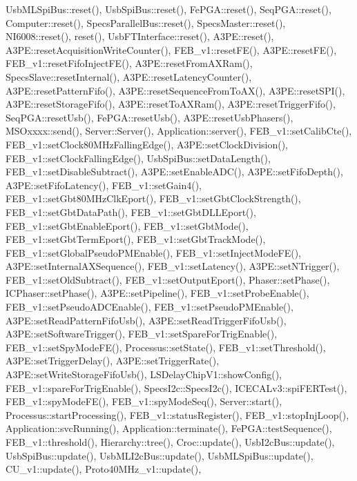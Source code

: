Usb\+M\+L\+Spi\+Bus\+::reset(), Usb\+Spi\+Bus\+::reset(), Fe\+P\+G\+A\+::reset(), Seq\+P\+G\+A\+::reset(), Computer\+::reset(), Specs\+Parallel\+Bus\+::reset(), Specs\+Master\+::reset(), N\+I6008\+::reset(), reset(), Usb\+F\+T\+Interface\+::reset(), A3\+P\+E\+::reset(), A3\+P\+E\+::reset\+Acquisition\+Write\+Counter(), F\+E\+B\+\_\+v1\+::reset\+F\+E(), A3\+P\+E\+::reset\+F\+E(), F\+E\+B\+\_\+v1\+::reset\+Fifo\+Inject\+F\+E(), A3\+P\+E\+::reset\+From\+A\+X\+Ram(), Specs\+Slave\+::reset\+Internal(), A3\+P\+E\+::reset\+Latency\+Counter(), A3\+P\+E\+::reset\+Pattern\+Fifo(), A3\+P\+E\+::reset\+Sequence\+From\+To\+A\+X(), A3\+P\+E\+::reset\+S\+P\+I(), A3\+P\+E\+::reset\+Storage\+Fifo(), A3\+P\+E\+::reset\+To\+A\+X\+Ram(), A3\+P\+E\+::reset\+Trigger\+Fifo(), Seq\+P\+G\+A\+::reset\+Usb(), Fe\+P\+G\+A\+::reset\+Usb(), A3\+P\+E\+::reset\+Usb\+Phasers(), M\+S\+Oxxxx\+::send(), Server\+::\+Server(), Application\+::server(), F\+E\+B\+\_\+v1\+::set\+Calib\+Cte(), F\+E\+B\+\_\+v1\+::set\+Clock80\+M\+Hz\+Falling\+Edge(), A3\+P\+E\+::set\+Clock\+Division(), F\+E\+B\+\_\+v1\+::set\+Clock\+Falling\+Edge(), Usb\+Spi\+Bus\+::set\+Data\+Length(), F\+E\+B\+\_\+v1\+::set\+Disable\+Subtract(), A3\+P\+E\+::set\+Enable\+A\+D\+C(), A3\+P\+E\+::set\+Fifo\+Depth(), A3\+P\+E\+::set\+Fifo\+Latency(), F\+E\+B\+\_\+v1\+::set\+Gain4(), F\+E\+B\+\_\+v1\+::set\+Gbt80\+M\+Hz\+Clk\+Eport(), F\+E\+B\+\_\+v1\+::set\+Gbt\+Clock\+Strength(), F\+E\+B\+\_\+v1\+::set\+Gbt\+Data\+Path(), F\+E\+B\+\_\+v1\+::set\+Gbt\+D\+L\+L\+Eport(), F\+E\+B\+\_\+v1\+::set\+Gbt\+Enable\+Eport(), F\+E\+B\+\_\+v1\+::set\+Gbt\+Mode(), F\+E\+B\+\_\+v1\+::set\+Gbt\+Term\+Eport(), F\+E\+B\+\_\+v1\+::set\+Gbt\+Track\+Mode(), F\+E\+B\+\_\+v1\+::set\+Global\+Pseudo\+P\+M\+Enable(), F\+E\+B\+\_\+v1\+::set\+Inject\+Mode\+F\+E(), A3\+P\+E\+::set\+Internal\+A\+X\+Sequence(), F\+E\+B\+\_\+v1\+::set\+Latency(), A3\+P\+E\+::set\+N\+Trigger(), F\+E\+B\+\_\+v1\+::set\+Old\+Subtract(), F\+E\+B\+\_\+v1\+::set\+Output\+Eport(), Phaser\+::set\+Phase(), I\+C\+Phaser\+::set\+Phase(), A3\+P\+E\+::set\+Pipeline(), F\+E\+B\+\_\+v1\+::set\+Probe\+Enable(), F\+E\+B\+\_\+v1\+::set\+Pseudo\+A\+D\+C\+Enable(), F\+E\+B\+\_\+v1\+::set\+Pseudo\+P\+M\+Enable(), A3\+P\+E\+::set\+Read\+Pattern\+Fifo\+Usb(), A3\+P\+E\+::set\+Read\+Trigger\+Fifo\+Usb(), A3\+P\+E\+::set\+Software\+Trigger(), F\+E\+B\+\_\+v1\+::set\+Spare\+For\+Trig\+Enable(), F\+E\+B\+\_\+v1\+::set\+Spy\+Mode\+F\+E(), Processus\+::set\+State(), F\+E\+B\+\_\+v1\+::set\+Threshold(), A3\+P\+E\+::set\+Trigger\+Delay(), A3\+P\+E\+::set\+Trigger\+Rate(), A3\+P\+E\+::set\+Write\+Storage\+Fifo\+Usb(), L\+S\+Delay\+Chip\+V1\+::show\+Config(), F\+E\+B\+\_\+v1\+::spare\+For\+Trig\+Enable(), Specs\+I2c\+::\+Specs\+I2c(), I\+C\+E\+C\+A\+Lv3\+::spi\+F\+E\+R\+Test(), F\+E\+B\+\_\+v1\+::spy\+Mode\+F\+E(), F\+E\+B\+\_\+v1\+::spy\+Mode\+Seq(), Server\+::start(), Processus\+::start\+Processing(), F\+E\+B\+\_\+v1\+::status\+Register(), F\+E\+B\+\_\+v1\+::stop\+Inj\+Loop(), Application\+::svc\+Running(), Application\+::terminate(), Fe\+P\+G\+A\+::test\+Sequence(), F\+E\+B\+\_\+v1\+::threshold(), Hierarchy\+::tree(), Croc\+::update(), Usb\+I2c\+Bus\+::update(), Usb\+Spi\+Bus\+::update(), Usb\+M\+L\+I2c\+Bus\+::update(), Usb\+M\+L\+Spi\+Bus\+::update(), C\+U\+\_\+v1\+::update(), Proto40\+M\+Hz\+\_\+v1\+::update(), 